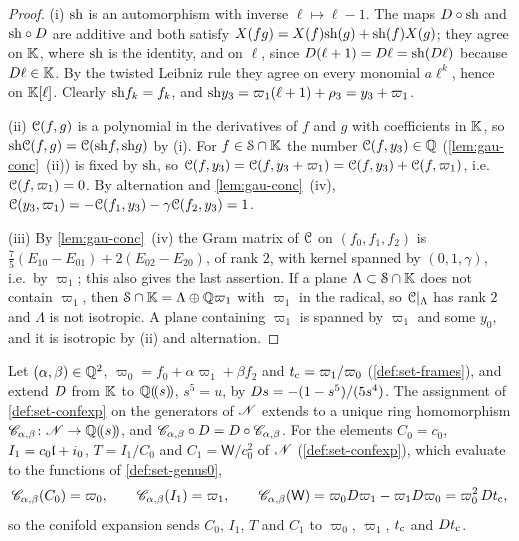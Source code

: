 \begin{proof}
(i) $\mathrm{sh}$ is an automorphism with inverse $\ell\mapsto\ell-1$. The maps $D\circ\mathrm{sh}$ and $\mathrm{sh}\circ D$ are additive and both satisfy $X(fg)=X(f)\mathrm{sh}(g)+\mathrm{sh}(f)X(g)$; they agree on $\mathbb{K}$, where $\mathrm{sh}$ is the identity, and on $\ell$, since $D(\ell+1)=D\ell=\mathrm{sh}(D\ell)$ because $D\ell\in\mathbb{K}$. By the twisted Leibniz rule they agree on every monomial $a\ell^k$, hence on $\mathbb{K}[\ell]$. Clearly $\mathrm{sh} f_k=f_k$, and $\mathrm{sh} y_3=\varpi_1(\ell+1)+\rho_3=y_3+\varpi_1$.

(ii) $\mathcal{C}(f,g)$ is a polynomial in the derivatives of $f$ and $g$ with coefficients in $\mathbb{K}$, so $\mathrm{sh}\mathcal{C}(f,g)=\mathcal{C}(\mathrm{sh} f,\mathrm{sh} g)$ by (i). For $f\in\mathcal S\cap\mathbb{K}$ the number $\mathcal{C}(f,y_3)\in\mathbb{Q}$ (\cref{lem:gau-conc}~(ii)) is fixed by $\mathrm{sh}$, so $\mathcal{C}(f,y_3)=\mathcal{C}(f,y_3+\varpi_1)=\mathcal{C}(f,y_3)+\mathcal{C}(f,\varpi_1)$, i.e.\ $\mathcal{C}(f,\varpi_1)=0$. By alternation and \cref{lem:gau-conc}~(iv), $\mathcal{C}(y_3,\varpi_1)=-\mathcal{C}(f_1,y_3)-\gamma\mathcal{C}(f_2,y_3)=1$.

(iii) By \cref{lem:gau-conc}~(iv) the Gram matrix of $\mathcal{C}$ on $(f_0,f_1,f_2)$ is $\frac75(E_{10}-E_{01})+2(E_{02}-E_{20})$, of rank $2$, with kernel spanned by $(0,1,\gamma)$, i.e.\ by $\varpi_1$; this also gives the last assertion. If a plane $\Lambda\subset\mathcal S\cap\mathbb{K}$ does not contain $\varpi_1$, then $\mathcal S\cap\mathbb{K}=\Lambda\oplus\mathbb{Q}\varpi_1$ with $\varpi_1$ in the radical, so $\mathcal{C}|_\Lambda$ has rank $2$ and $\Lambda$ is not isotropic. A plane containing $\varpi_1$ is spanned by $\varpi_1$ and some $y_0$, and it is isotropic by (ii) and alternation.
\end{proof}

\begin{lem}
\label{lem:gau-confexp}
Let $(\alpha,\beta)\in\mathbb{Q}^2$, $\varpi_0=f_0+\alpha\varpi_1+\beta f_2$ and $t_{\mathrm{c}}=\varpi_1/\varpi_0$ (\cref{def:set-frames}), and extend $D$ from $\mathbb{K}$ to $\mathbb{Q}(\!(s)\!)$, $s^5=u$, by $D s=-(1-s^5)/(5s^4)$. The assignment of \cref{def:set-confexp} on the generators of $\mathscr{N}$ extends to a unique ring homomorphism $\mathscr{C}_{\alpha,\beta}\colon\mathscr{N}\to\mathbb{Q}(\!(s)\!)$, and $\mathscr{C}_{\alpha,\beta}\circ D=D\circ\mathscr{C}_{\alpha,\beta}$. For the elements $C_0=c_0$, $I_1=c_0\mathfrak{l}+i_0$, $T=I_1/C_0$ and $C_1=\mathsf W/c_0^2$ of $\mathscr{N}$ (\cref{def:set-confexp}), which evaluate to the functions of \cref{def:set-genus0},
\[
\mathscr{C}_{\alpha,\beta}(C_0)=\varpi_0,\qquad \mathscr{C}_{\alpha,\beta}(I_1)=\varpi_1,\qquad \mathscr{C}_{\alpha,\beta}(\mathsf W)=\varpi_0D\varpi_1-\varpi_1D\varpi_0=\varpi_0^2\,Dt_{\mathrm{c}} ,
\]
so the conifold expansion sends $C_0$, $I_1$, $T$ and $C_1$ to $\varpi_0$, $\varpi_1$, $t_{\mathrm{c}}$ and $Dt_{\mathrm{c}}$.
\end{lem}

